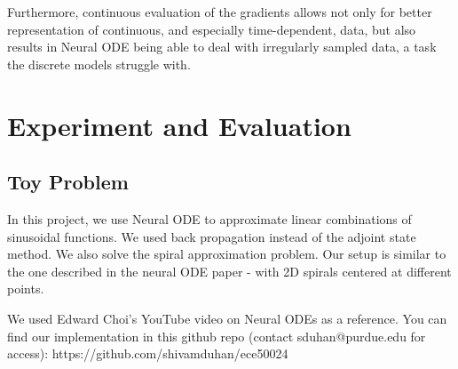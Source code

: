 \documentclass{article}
\begin{document}
Furthermore, continuous evaluation of the gradients allows not only for better representation of continuous, and especially time-dependent, data, but also results in Neural ODE being able to deal with irregularly sampled data, a task the discrete models struggle with.




\section{Experiment and Evaluation}
\subsection{Toy Problem}
In this project, we use Neural ODE to approximate linear combinations of sinusoidal functions. We used back propagation instead of the adjoint state method. We also solve the spiral approximation problem. Our setup is similar to the one described in the neural ODE paper - with 2D spirals centered at different points. 

We used Edward Choi's YouTube video on Neural ODEs as a reference. You can find our implementation in this github repo (contact sduhan@purdue.edu for access): https://github.com/shivamduhan/ece50024
\end{document}
